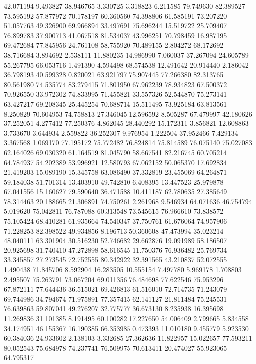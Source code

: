 42.071194
9.493827
38.946765
3.330725
3.318823
6.211585
79.749630
82.389527
73.595192
57.877972
70.178197
60.360560
74.398806
61.585191
73.207220
51.057763
49.326900
69.966894
33.497691
75.696244
15.519722
25.709407
76.899783
37.900713
41.067518
81.534037
43.996251
70.798459
16.987195
69.472684
77.845956
24.761108
58.755920
70.489155
2.804272
68.172692
38.716684
3.894692
2.538111
11.880235
14.986990
7.060037
37.267094
24.605789
55.267795
66.053716
1.491390
4.594498
68.574538
12.491642
20.914440
2.186042
36.798193
40.599328
0.820021
63.921797
75.907445
77.266380
82.313765
80.561980
74.535774
83.279415
71.801950
67.962239
78.934823
67.500372
70.926550
33.972302
74.833995
71.455821
33.557326
52.544870
75.273141
63.427217
69.208345
25.445254
70.688714
15.511495
73.925184
63.813561
8.250829
70.604953
74.758813
27.346045
12.596592
8.505287
67.479997
42.180626
37.252051
4.277412
77.250376
4.862045
28.440292
15.172311
3.856821
12.608863
3.733670
3.644934
2.559822
36.252307
9.976954
1.222504
37.952466
7.429134
3.367568
1.069170
77.195172
75.772482
76.824814
75.814589
76.075140
75.027083
62.164026
69.030320
61.164519
81.045790
58.667541
82.216745
60.705214
64.784937
54.202389
53.996921
12.580793
67.062152
50.065370
17.692834
21.419203
15.089190
15.345758
63.086490
37.332819
23.455069
64.264871
59.184038
51.701314
13.403910
49.742810
6.408395
13.447523
25.979878
67.041556
15.160627
79.590640
36.471588
10.411187
62.780635
27.385649
78.314463
20.188665
21.306891
74.750261
2.261968
9.546934
64.071636
46.754794
5.019620
75.042811
76.787088
60.313548
73.545615
76.966610
73.838572
75.105424
68.410281
61.935664
74.540347
37.750761
61.676064
74.957906
71.228253
82.398522
49.934856
8.196713
50.360608
47.473994
35.023214
48.040111
63.301904
30.516230
52.746682
29.662876
19.091989
58.186507
20.925698
31.740410
47.272898
58.616545
11.750376
76.936482
25.769734
33.345857
27.273545
72.752555
80.342922
32.391565
43.210837
52.072555
1.490438
71.845706
8.592904
16.283505
10.555154
7.497780
5.969178
1.708803
2.495507
75.263791
73.067204
69.011356
76.484698
77.622546
75.953296
67.872111
77.644436
36.515021
69.426813
61.516010
72.714735
71.243079
69.744986
34.794674
71.975891
77.357415
62.141127
21.811484
75.245531
76.639863
59.807041
49.276207
32.775777
36.673130
8.235938
16.395698
11.269836
31.101385
8.191495
60.100282
17.227650
54.006409
2.799665
5.834558
34.174951
46.155367
16.190385
66.353985
0.473393
11.010180
9.455779
5.923530
60.384036
24.933602
2.138103
3.332685
27.362636
11.822957
15.022657
77.593211
80.052543
75.684978
74.237741
76.509975
70.613411
20.474027
55.923065
64.795317
